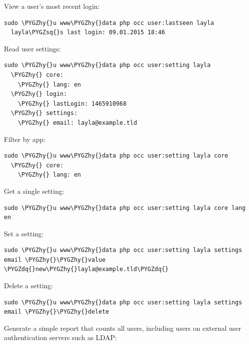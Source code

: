 \documentclass[letterpaper,10pt,english]{sphinxmanual}
\def\PYGZhy{\char`\-}
\def\PYGZsq{\char`\'}
\def\PYGZdq{\char`\"}
\begin{document}
View a user's most recent login:

\begin{Verbatim}[commandchars=\\\{\}]
sudo \PYGZhy{}u www\PYGZhy{}data php occ user:lastseen layla
  layla\PYGZsq{}s last login: 09.01.2015 18:46
\end{Verbatim}

Read user settings:

\begin{Verbatim}[commandchars=\\\{\}]
sudo \PYGZhy{}u www\PYGZhy{}data php occ user:setting layla
  \PYGZhy{} core:
    \PYGZhy{} lang: en
  \PYGZhy{} login:
    \PYGZhy{} lastLogin: 1465910968
  \PYGZhy{} settings:
    \PYGZhy{} email: layla@example.tld
\end{Verbatim}

Filter by app:

\begin{Verbatim}[commandchars=\\\{\}]
sudo \PYGZhy{}u www\PYGZhy{}data php occ user:setting layla core
  \PYGZhy{} core:
    \PYGZhy{} lang: en
\end{Verbatim}

Get a single setting:

\begin{Verbatim}[commandchars=\\\{\}]
sudo \PYGZhy{}u www\PYGZhy{}data php occ user:setting layla core lang
en
\end{Verbatim}

Set a setting:

\begin{Verbatim}[commandchars=\\\{\}]
sudo \PYGZhy{}u www\PYGZhy{}data php occ user:setting layla settings email \PYGZhy{}\PYGZhy{}value \PYGZdq{}new\PYGZhy{}layla@example.tld\PYGZdq{}
\end{Verbatim}

Delete a setting:

\begin{Verbatim}[commandchars=\\\{\}]
sudo \PYGZhy{}u www\PYGZhy{}data php occ user:setting layla settings email \PYGZhy{}\PYGZhy{}delete
\end{Verbatim}

Generate a simple report that counts all users, including users on external user
authentication servers such as LDAP:
\end{document}
